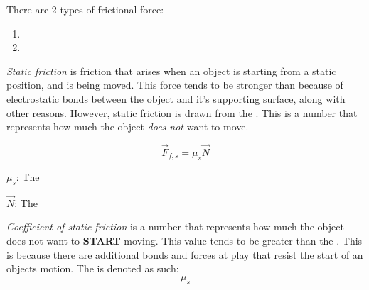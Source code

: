 There are 2 types of frictional force:
\begin{enumerate}
  \item {}
  \item {}
\end{enumerate}

\begin{definition}\label{def:Static Friction}
  \emph{Static friction} is friction that arises when an object is starting from a static position, and is being moved.
  This force tends to be stronger than  because of electrostatic bonds between the object and it's supporting surface, along with other reasons.
  However, static friction is drawn from the .
  This is a  number that represents how much the object \emph{does not} want to move.

  \begin{equation}\label{eq:Static Friction}
    \vec{F}_{f,s} = \mu_{s} \vec{N}
  \end{equation}
  \begin{description}[noitemsep]
    \item $\mu_{s}$: The 
    \item $\vec{N}$: The 
  \end{description}
\end{definition}

\begin{definition}\label{def:Coefficient of Static Friction}
  \emph{Coefficient of static friction} is a  number that represents how much the object does not want to \textbf{START} moving.
  This value tends to be greater than the .
  This is because there are additional bonds and forces at play that resist the start of an objects motion.
  The  is denoted as such:
  \begin{equation}\label{eq:Coefficient of Static Friction}
    \mu_{s}
  \end{equation}
\end{definition}

